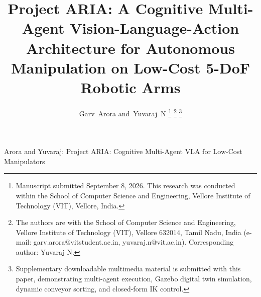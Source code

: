 \documentclass[journal]{IEEEtran}
\begin{document}
\title{Project ARIA: A Cognitive Multi-Agent Vision-Language-Action Architecture for Autonomous Manipulation on Low-Cost 5-DoF Robotic Arms}

\author{Garv~Arora
        and~Yuvaraj~N%
\thanks{Manuscript submitted September 8, 2026. This research was conducted within the School of Computer Science and Engineering, Vellore Institute of Technology (VIT), Vellore, India.}%
\thanks{The authors are with the School of Computer Science and Engineering, Vellore Institute of Technology (VIT), Vellore 632014, Tamil Nadu, India (e-mail: garv.arora@vitstudent.ac.in, yuvaraj.n@vit.ac.in). Corresponding author: Yuvaraj N.}%
\thanks{Supplementary downloadable multimedia material is submitted with this paper, demonstrating multi-agent execution, Gazebo digital twin simulation, dynamic conveyor sorting, and closed-form IK control.}}

%
{Arora and Yuvaraj: Project ARIA: Cognitive Multi-Agent VLA for Low-Cost Manipulators}

\maketitle
\end{document}
